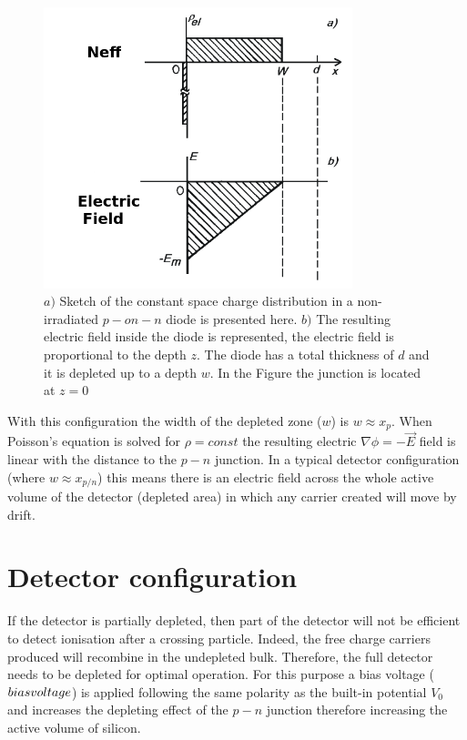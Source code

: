 \begin{figure}[H]
	\centering
	\includegraphics[width=0.8\textwidth]{Neff_unirrad.png}
	\caption{$a)$ Sketch of the constant space charge distribution in a non-irradiated $p-on-n$ diode is presented here. $b)$ The resulting electric field inside the diode is represented, the electric field is proportional to the depth $z$. The diode has a total thickness of $d$ and it is depleted up to a depth $w$. In the Figure the junction is located at $z = 0$}
	\label{fig:neffEfield}
\end{figure}


With this configuration the width of the depleted zone ($w$) is $w \approx x_p$.
When Poisson's equation is solved for $\rho = const$ the resulting electric
$\nabla \phi = -\overrightarrow {E}$ field is linear with the distance to the $p-n$
junction. In a typical detector configuration (where $w \approx x_{p/n}$) this
means there is an electric field across the whole active volume of the detector
(depleted area) in which any carrier created will move by drift. 


\section{Detector configuration}
\label{sec:detConfig}

If the detector is partially depleted, then part of the detector will not be
efficient to detect ionisation after a crossing particle. Indeed, the free
charge carriers produced will recombine in the undepleted bulk. Therefore, the
full detector needs to be depleted for optimal operation. For this purpose a
bias voltage ($bias voltage$) is applied following the same polarity as the built-in
potential $V_0$ and increases the depleting effect of the $p-n$ junction
therefore increasing the active volume of silicon. 

